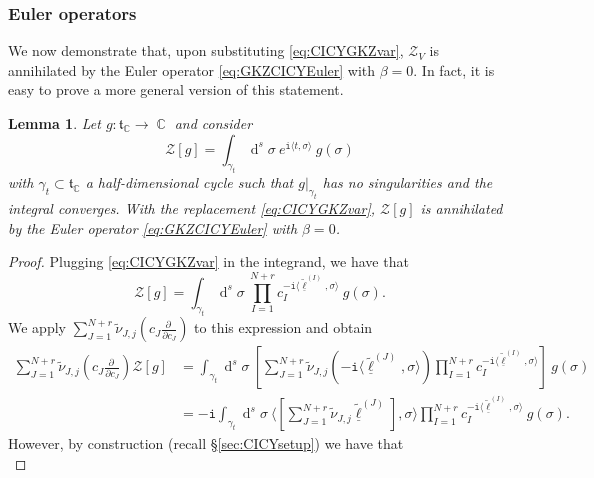 \documentclass[12pt,a4paper,oneside]{amsart}
\numberwithin{equation}{section}
\newtheorem{lem}[thm]{Lemma}
\theoremstyle{definition}
\theoremstyle{remark}
\DeclareMathOperator{\C}{\mathbb{C}}
\DeclareMathOperator{\dd}{d}
\newcommand{\mz}{\mathcal{Z}}
\newcommand{\ii}{\mathtt{i}}
\begin{document}
\begin{appendix}
\subsubsection{Euler operators}
\label{app:sec:EuOp}
We now demonstrate that, upon substituting \eqref{eq:CICYGKZvar}, $\mz_V$ is annihilated by the Euler operator \eqref{eq:GKZCICYEuler} with $\beta=0$. In fact, it is easy to prove a more general version of this statement.
\begin{lem}\label{lem:EuOpCICY}
    Let $g: \mathfrak{t}_{\C} \longrightarrow \C$ and consider 
    \begin{equation*}
        \mz [g] = \int_{\gamma_t} \dd^s \sigma~e^{\ii \langle t, \sigma\rangle} ~g(\sigma)
    \end{equation*}
    with $\gamma_t \subset \mathfrak{t}_{\C}$ a half-dimensional cycle such that $g\vert_{\gamma_t}$ has no singularities and the integral converges. With the replacement \eqref{eq:CICYGKZvar}, $\mz [g]$ is annihilated by the Euler operator \eqref{eq:GKZCICYEuler} with $\beta=0$.
\end{lem}
\begin{proof}
    Plugging \eqref{eq:CICYGKZvar} in the integrand, we have that 
    \begin{equation*}
        \mz [g] = \int_{\gamma_t} \dd^s \sigma~\prod_{I=1}^{N+r} c_I^{-\ii \langle \underline{\tilde{\ell}}^{(I)}, \sigma\rangle} ~g(\sigma) .
    \end{equation*}
    We apply $\sum_{J=1}^{N+r} \tilde{\nu}_{J,j} \left( c_J \frac{\partial \ }{\partial c_J} \right) $ to this expression and obtain 
    \begin{equation*}
    \begin{aligned}
        \sum_{J=1}^{N+r} \tilde{\nu}_{J,j} \left( c_J \frac{\partial \ }{\partial c_J} \right) \mz [g] &= \int_{\gamma_t} \dd^s \sigma~\left[ \sum_{J=1}^{N+r} \tilde{\nu}_{J,j} \left( -\ii \langle \underline{\tilde{\ell}}^{(J)}, \sigma\rangle \right)\prod_{I=1}^{N+r} c_I^{-\ii \langle \underline{\tilde{\ell}}^{(I)}, \sigma\rangle} \right] ~g(\sigma) \\
        &=  -\ii \int_{\gamma_t} \dd^s \sigma~ \langle \left[ \sum_{J=1}^{N+r} \tilde{\nu}_{J,j} \underline{\tilde{\ell}}^{(J)}  \right] , \sigma\rangle \prod_{I=1}^{N+r} c_I^{-\ii \langle \underline{\tilde{\ell}}^{(I)}, \sigma\rangle}  ~g(\sigma) .
    \end{aligned}
    \end{equation*}
    However, by construction (recall \S\ref{sec:CICYsetup}) we have that 
    \begin{equation*}

\end{equation*}
\end{proof}
\end{appendix}
\end{document}
